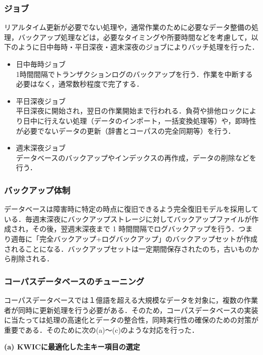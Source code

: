 \documentclass[japanese]{jnlp_1.4}
\begin{document}
\subsubsection*{ジョブ}

リアルタイム更新が必要でない処理や，通常作業のために必要なデータ整備の処理，バックアップ処理などは，必要なタイミングや所要時間などを考慮して，以下のように日中毎時・平日深夜・週末深夜のジョブによりバッチ処理を行った．

\begin{itemize}
\item 日中毎時ジョブ\\
 1時間間隔でトランザクションログのバックアップを行う．作業を中断する必要はなく，通常数秒程度で完了する．
\item 平日深夜ジョブ\\
平日深夜に開始され，翌日の作業開始まで行われる．負荷や排他ロックにより日中に行えない処理（データのインポート，一括変換処理等）や，即時性が必要でないデータの更新（辞書とコーパスの完全同期等）を行う．
\item 週末深夜ジョブ\\
データベースのバックアップやインデックスの再作成，データの削除などを行う．
\end{itemize}


\subsubsection*{バックアップ体制}

データベースは障害時に特定の時点に復旧できるよう完全復旧モデルを採用している．毎週末深夜にバックアップストレージに対してバックアップファイルが作成され，その後，翌週末深夜まで 1 時間間隔でログバックアップを行う．つまり週毎に「完全バックアップ+ログバックアップ」のバックアップセットが作成されることになる．バックアップセットは一定期間保存されたのち，古いものから削除される．

\subsubsection*{コーパスデータベースのチューニング}

コーパスデータベースでは１億語を超える大規模なデータを対象に，複数の作業者が同時に更新処理を行う必要がある．そのため，コーパスデータベースの実装に当たっては処理の高速化とデータの整合性，同時実行性の確保のための対策が重要である．そのために次の(a)〜(c)のような対応を行った．


\noindent
{\bf (a) KWICに最適化した主キー項目の選定}
\end{document}
